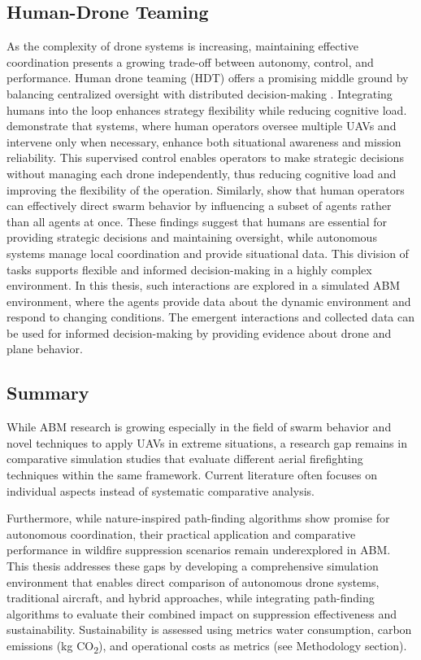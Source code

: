 \documentclass[11pt, a4paper]{article}
\begin{document}
\subsection{Human-Drone Teaming}

As the complexity of drone systems is increasing, maintaining effective coordination presents a growing trade-off between autonomy, control, and performance. Human drone teaming (HDT) offers a promising middle ground by balancing centralized oversight with distributed decision-making \citep{asavasirikulkij2023human_Workload}. Integrating humans into the loop enhances strategy flexibility while reducing cognitive load. \citet{SAT_first} demonstrate that systems, where human operators oversee multiple UAVs and intervene only when necessary, enhance both situational awareness and mission reliability. This supervised control enables operators to make strategic decisions without managing each drone independently, thus reducing cognitive load and improving the flexibility of the operation. Similarly, \citet*{lewisHumanFactorsIssues2012} show that human operators can effectively direct swarm behavior by influencing a subset of agents rather than all agents at once.
These findings suggest that humans are essential for providing strategic decisions and maintaining oversight, while autonomous systems manage local coordination and provide situational data. This division of tasks supports flexible and informed decision-making in a highly complex environment.
In this thesis, such interactions are explored in a simulated ABM environment, where the agents provide data about the dynamic environment and respond to changing conditions. The emergent interactions and collected data can be used for informed decision-making by providing evidence about drone and plane behavior.

\subsection{Summary}

While ABM research is growing especially in the field of swarm behavior and novel techniques to apply UAVs in extreme situations, a research gap remains in comparative simulation studies that evaluate different aerial firefighting techniques within the same framework. Current literature often focuses on individual aspects instead of systematic comparative analysis.

Furthermore, while nature-inspired path-finding algorithms show promise for autonomous coordination, their practical application and comparative performance in wildfire suppression scenarios remain underexplored in ABM. This thesis addresses these gaps by developing a comprehensive simulation environment that enables direct comparison of autonomous drone systems, traditional aircraft, and hybrid approaches, while integrating path-finding algorithms to evaluate their combined impact on suppression effectiveness and sustainability. Sustainability is assessed using metrics water consumption, carbon emissions (kg CO\textsubscript{2}), and operational costs as metrics (see Methodology section).
\end{document}
